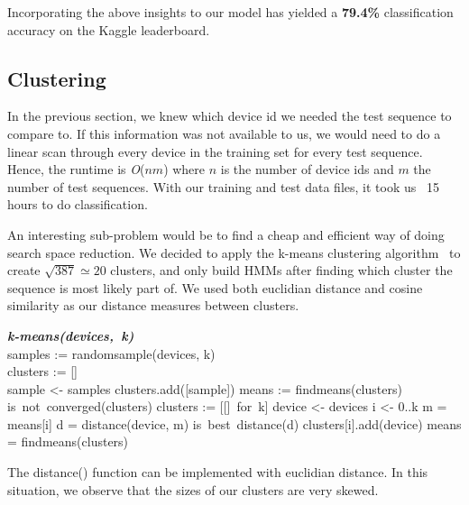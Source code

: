Incorporating the above insights to our model has yielded a \textbf{79.4\%}
classification accuracy on the Kaggle leaderboard.

\subsection{Clustering}
In the previous section, we knew which device id we needed the test sequence
to compare to. If this information was not available to us, we would need
to do a linear scan through every device in the training set for every
test sequence. Hence, the runtime is \textit{O}($nm$) where $n$ is the
number of device ids and $m$ the number of test sequences. With our
training and test data files, it took us ~15 hours to do classification.

An interesting sub-problem would be to find a cheap and efficient way of
doing search space reduction. We decided to apply the k-means clustering
algorithm~\cite{kmeans} to create $\sqrt{387} \simeq 20$ clusters, and only build HMMs
after finding which cluster the sequence is most likely part of. We used both
euclidian distance and cosine similarity as our distance measures between
clusters.

\begin{program}
\mbox{\textit{\textbf{k-means(devices, k)}}}
\BEGIN \\
  samples := randomsample(devices, k) \\
  clusters := [] \\
  \FOR sample <- samples \DO
    clusters.add([sample]) \OD
  means := findmeans(clusters)
  \WHILE is\ not\ converged(clusters) \DO
    clusters := [[]\ for\ k]
    \FOR device <- devices \DO
      \FOR i <- 0..k \DO
        m = means[i]
        d = distance(device, m)
        \IF is\ best\ distance(d)
          clusters[i].add(device)
        \OD
        \OD
    means = findmeans(clusters)
    \OD
\END
\end{program}

The distance() function can be implemented with euclidian distance. In this
situation, we observe that the sizes of our clusters are very skewed.

